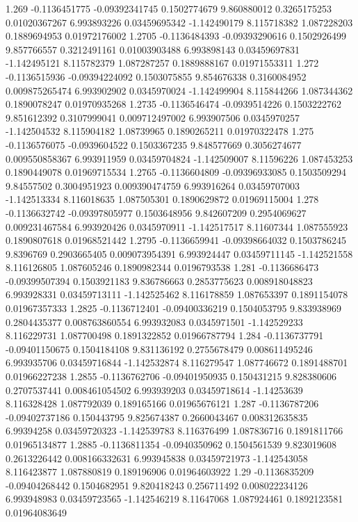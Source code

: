 {1.269 -0.1136451775 -0.09392341745 0.1502774679 9.860880012 0.3265175253 0.01020367267 6.993893226 0.03459695342 -1.142490179 8.115718382 1.087228203 0.1889694953 0.01972176002
1.2705 -0.1136484393 -0.09393290616 0.1502926499 9.857766557 0.3212491161 0.01003903488 6.993898143 0.03459697831 -1.142495121 8.115782379 1.087287257 0.1889888167 0.01971553311
1.272 -0.1136515936 -0.09394224092 0.1503075855 9.854676338 0.3160084952 0.009875265474 6.993902902 0.0345970024 -1.142499904 8.115844266 1.087344362 0.1890078247 0.01970935268
1.2735 -0.1136546474 -0.0939514226 0.1503222762 9.851612392 0.3107999041 0.009712497002 6.993907506 0.0345970257 -1.142504532 8.115904182 1.08739965 0.1890265211 0.01970322478
1.275 -0.1136576075 -0.0939604522 0.1503367235 9.848577669 0.3056274677 0.009550858367 6.993911959 0.03459704824 -1.142509007 8.11596226 1.087453253 0.1890449078 0.01969715534
1.2765 -0.1136604809 -0.09396933085 0.1503509294 9.84557502 0.3004951923 0.009390474759 6.993916264 0.03459707003 -1.142513334 8.116018635 1.087505301 0.1890629872 0.01969115004
1.278 -0.1136632742 -0.09397805977 0.1503648956 9.842607209 0.2954069627 0.009231467584 6.993920426 0.0345970911 -1.142517517 8.11607344 1.087555923 0.1890807618 0.01968521442
1.2795 -0.1136659941 -0.09398664032 0.1503786245 9.8396769 0.2903665405 0.009073954391 6.993924447 0.03459711145 -1.142521558 8.116126805 1.087605246 0.1890982344 0.0196793538
1.281 -0.1136686473 -0.09399507394 0.1503921183 9.836786663 0.2853775623 0.008918048823 6.993928331 0.03459713111 -1.142525462 8.116178859 1.087653397 0.1891154078 0.01967357333
1.2825 -0.1136712401 -0.09400336219 0.1504053795 9.833938969 0.2804435377 0.008763860554 6.993932083 0.0345971501 -1.142529233 8.116229731 1.087700498 0.1891322852 0.01966787794
1.284 -0.1136737791 -0.09401150675 0.1504184108 9.831136192 0.2755678479 0.008611495246 6.993935706 0.03459716844 -1.142532874 8.116279547 1.087746672 0.1891488701 0.01966227238
1.2855 -0.1136762706 -0.09401950935 0.150431215 9.828380606 0.2707537441 0.008461054502 6.993939203 0.03459718614 -1.14253639 8.116328428 1.087792039 0.189165166 0.01965676121
1.287 -0.1136787206 -0.09402737186 0.150443795 9.825674387 0.2660043467 0.008312635835 6.99394258 0.03459720323 -1.142539783 8.116376499 1.087836716 0.1891811766 0.01965134877
1.2885 -0.1136811354 -0.0940350962 0.1504561539 9.823019608 0.2613226442 0.008166332631 6.993945838 0.03459721973 -1.142543058 8.116423877 1.087880819 0.189196906 0.01964603922
1.29 -0.1136835209 -0.09404268442 0.1504682951 9.820418243 0.256711492 0.008022234126 6.993948983 0.03459723565 -1.142546219 8.11647068 1.087924461 0.1892123581 0.01964083649
}
